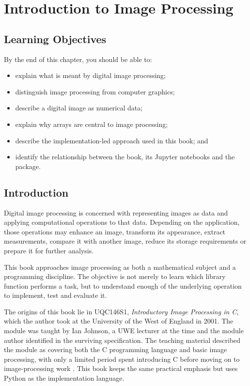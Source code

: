 \chapter{Introduction to Image Processing}
\label{ch:introduction}

\section{Learning Objectives}

By the end of this chapter, you should be able to:

\begin{itemize}
    \item explain what is meant by digital image processing;
    \item distinguish image processing from computer graphics;
    \item describe a digital image as numerical data;
    \item explain why arrays are central to image processing;
    \item describe the implementation-led approach used in this book; and
    \item identify the relationship between the book, its Jupyter notebooks and
          the \pyimage{} package.
\end{itemize}

\section{Introduction}

Digital image processing is concerned with representing images as data and
applying computational operations to that data. Depending on the application,
those operations may enhance an image, transform its appearance, extract
measurements, compare it with another image, reduce its storage requirements or
prepare it for further analysis.

This book approaches image processing as both a mathematical subject and a
programming discipline. The objective is not merely to learn which library
function performs a task, but to understand enough of the underlying operation
to implement, test and evaluate it.

\begin{historicalnote}
The origins of this book lie in UQC146S1, \emph{Introductory Image Processing
in C}, which the author took at the University of the West of England in 2001.
The module was taught by Ian Johnson, a UWE lecturer at the time and the module
author identified in the surviving specification\cite{uwe_uqc146_spec}. The
teaching material described the module as covering both the C programming
language and basic image processing, with only a limited period spent
introducing C before moving on to image-processing work
\cite{johnson_uqc146_intro}. This book keeps the same practical emphasis but
uses Python as the implementation language.
\end{historicalnote}

